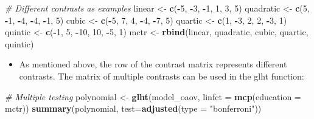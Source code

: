 \documentclass[
]{book}
\newenvironment{Shaded}{\begin{snugshade}}{\end{snugshade}}
\newcommand{\AttributeTok}[1]{\textcolor[rgb]{0.13,0.29,0.53}{#1}}
\newcommand{\CommentTok}[1]{\textcolor[rgb]{0.56,0.35,0.01}{\textit{#1}}}
\newcommand{\DecValTok}[1]{\textcolor[rgb]{0.00,0.00,0.81}{#1}}
\newcommand{\FunctionTok}[1]{\textcolor[rgb]{0.13,0.29,0.53}{\textbf{#1}}}
\newcommand{\NormalTok}[1]{#1}
\newcommand{\OtherTok}[1]{\textcolor[rgb]{0.56,0.35,0.01}{#1}}
\newcommand{\SpecialCharTok}[1]{\textcolor[rgb]{0.81,0.36,0.00}{\textbf{#1}}}
\newcommand{\StringTok}[1]{\textcolor[rgb]{0.31,0.60,0.02}{#1}}
\providecommand{\tightlist}{%
  \setlength{\itemsep}{0pt}\setlength{\parskip}{0pt}}
\begin{document}
\begin{Shaded}
\begin{Highlighting}[]
\CommentTok{\# Different contrasts as examples}
\NormalTok{linear }\OtherTok{\textless{}{-}} \FunctionTok{c}\NormalTok{(}\SpecialCharTok{{-}}\DecValTok{5}\NormalTok{, }\SpecialCharTok{{-}}\DecValTok{3}\NormalTok{, }\SpecialCharTok{{-}}\DecValTok{1}\NormalTok{, }\DecValTok{1}\NormalTok{, }\DecValTok{3}\NormalTok{, }\DecValTok{5}\NormalTok{)}
\NormalTok{quadratic }\OtherTok{\textless{}{-}} \FunctionTok{c}\NormalTok{(}\DecValTok{5}\NormalTok{, }\SpecialCharTok{{-}}\DecValTok{1}\NormalTok{, }\SpecialCharTok{{-}}\DecValTok{4}\NormalTok{, }\SpecialCharTok{{-}}\DecValTok{4}\NormalTok{, }\SpecialCharTok{{-}}\DecValTok{1}\NormalTok{, }\DecValTok{5}\NormalTok{)}
\NormalTok{cubic }\OtherTok{\textless{}{-}} \FunctionTok{c}\NormalTok{(}\SpecialCharTok{{-}}\DecValTok{5}\NormalTok{, }\DecValTok{7}\NormalTok{, }\DecValTok{4}\NormalTok{, }\SpecialCharTok{{-}}\DecValTok{4}\NormalTok{, }\SpecialCharTok{{-}}\DecValTok{7}\NormalTok{, }\DecValTok{5}\NormalTok{)}
\NormalTok{quartic }\OtherTok{\textless{}{-}} \FunctionTok{c}\NormalTok{(}\DecValTok{1}\NormalTok{, }\SpecialCharTok{{-}}\DecValTok{3}\NormalTok{, }\DecValTok{2}\NormalTok{, }\DecValTok{2}\NormalTok{, }\SpecialCharTok{{-}}\DecValTok{3}\NormalTok{, }\DecValTok{1}\NormalTok{)}
\NormalTok{quintic }\OtherTok{\textless{}{-}} \FunctionTok{c}\NormalTok{(}\SpecialCharTok{{-}}\DecValTok{1}\NormalTok{, }\DecValTok{5}\NormalTok{, }\SpecialCharTok{{-}}\DecValTok{10}\NormalTok{, }\DecValTok{10}\NormalTok{, }\SpecialCharTok{{-}}\DecValTok{5}\NormalTok{, }\DecValTok{1}\NormalTok{)}
\NormalTok{mctr }\OtherTok{\textless{}{-}} \FunctionTok{rbind}\NormalTok{(linear, quadratic, cubic, quartic, quintic)}
\end{Highlighting}
\end{Shaded}

\begin{itemize}
\tightlist
\item
  As mentioned above, the row of the contrast matrix represents different contrasts. The matrix of multiple contrasts can be used in the glht function:
\end{itemize}

\begin{Shaded}
\begin{Highlighting}[]
\CommentTok{\# Multiple testing}
\NormalTok{polynomial }\OtherTok{\textless{}{-}} \FunctionTok{glht}\NormalTok{(model\_oaov, }\AttributeTok{linfct =} \FunctionTok{mcp}\NormalTok{(}\AttributeTok{education =}\NormalTok{ mctr))}
\FunctionTok{summary}\NormalTok{(polynomial, }\AttributeTok{test=}\FunctionTok{adjusted}\NormalTok{(}\AttributeTok{type =} \StringTok{"bonferroni"}\NormalTok{))}
\end{Highlighting}
\end{Shaded}
\end{document}
